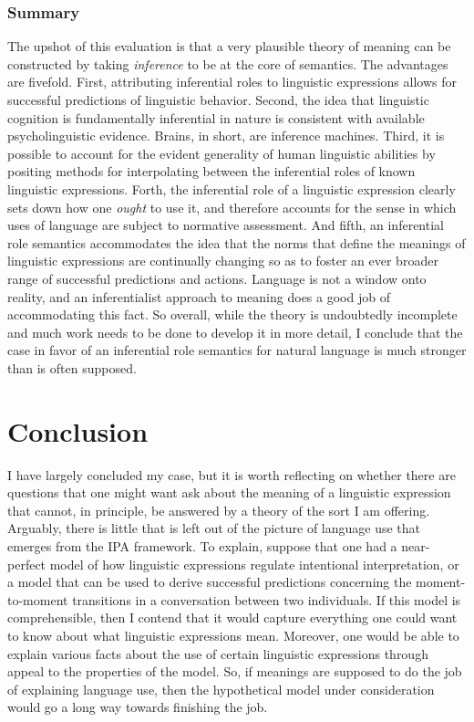 \subsubsection{Summary}

The upshot of this evaluation is that a very plausible theory of meaning can be constructed by taking \textit{inference} to be at the core of semantics. The advantages are fivefold. First, attributing inferential roles to linguistic expressions allows for successful predictions of linguistic behavior. Second, the idea that linguistic cognition is fundamentally inferential in nature is consistent with available psycholinguistic evidence. Brains, in short, are inference machines. Third, it is possible to account for the evident generality of human linguistic abilities by positing methods for interpolating between the inferential roles of known linguistic expressions. Forth, the inferential role of a linguistic expression clearly sets down how one \textit{ought} to use it, and therefore accounts for the sense in which uses of language are subject to normative assessment. And fifth, an inferential role semantics accommodates the idea that the norms that define the meanings of linguistic expressions are continually changing so as to foster an ever broader range of successful predictions and actions. Language is not a window onto reality, and an inferentialist approach to meaning does a good job of accommodating this fact. So overall, while the theory is undoubtedly incomplete and much work needs to be done to develop it in more detail, I conclude that the case in favor of an inferential role semantics for natural language is much stronger than is often supposed. 

\section{Conclusion}

I have largely concluded my case, but it is worth reflecting on whether there are questions that one might want ask about the meaning of a linguistic expression that cannot, in principle, be answered by a theory of the sort I am offering. Arguably, there is little that is left out of the picture of language use that emerges from the IPA framework. To explain, suppose that one had a near-perfect model of how linguistic expressions regulate intentional interpretation, or a model that can be used to derive successful predictions concerning the moment-to-moment transitions in a conversation between two individuals. If this model is comprehensible, then I contend that it would capture everything one could want to know about what linguistic expressions mean. Moreover, one would be able to explain various facts about the use of certain linguistic expressions through appeal to the properties of the model. So, if meanings are supposed to do the job of explaining language use, then the hypothetical model under consideration would go a long way towards finishing the job.

